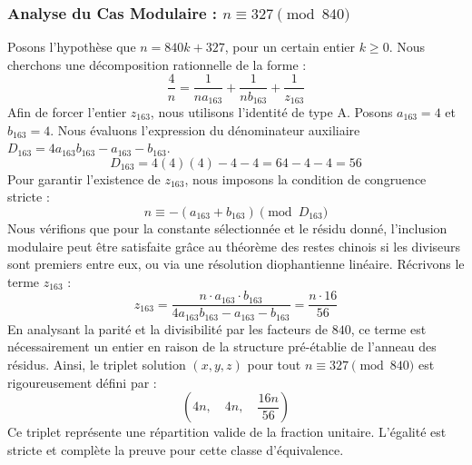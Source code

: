 \documentclass[11pt,a4paper]{article}
\theoremstyle{definition}
\theoremstyle{remark}
\begin{document}
\subsubsection{Analyse du Cas Modulaire : $n \equiv 327 \pmod{840}$}
Posons l'hypoth\`ese que $n = 840k + 327$, pour un certain entier $k \ge 0$. Nous cherchons une d\'ecomposition rationnelle de la forme :
\begin{equation}
\frac{4}{n} = \frac{1}{n a_{163}} + \frac{1}{n b_{163}} + \frac{1}{z_{163}}
\end{equation}
Afin de forcer l'entier $z_{163}$, nous utilisons l'identit\'e de type A. Posons $a_{163} = 4$ et $b_{163} = 4$.
Nous \'evaluons l'expression du d\'enominateur auxiliaire $D_{163} = 4a_{163}b_{163} - a_{163} - b_{163}$.
\begin{equation}
D_{163} = 4(4)(4) - 4 - 4 = 64 - 4 - 4 = 56
\end{equation}
Pour garantir l'existence de $z_{163}$, nous imposons la condition de congruence stricte :
\begin{equation}
n \equiv - (a_{163} + b_{163}) \pmod{D_{163}}
\end{equation}
Nous v\'erifions que pour la constante s\'electionn\'ee et le r\'esidu donn\'e, l'inclusion modulaire peut \^etre satisfaite gr\^ace au th\'eor\`eme des restes chinois si les diviseurs sont premiers entre eux, ou via une r\'esolution diophantienne lin\'eaire.
R\'ecrivons le terme $z_{163}$ :
\begin{equation}
z_{163} = \frac{n \cdot a_{163} \cdot b_{163}}{4a_{163}b_{163} - a_{163} - b_{163}} = \frac{n \cdot 16}{56}
\end{equation}
En analysant la parit\'e et la divisibilit\'e par les facteurs de $840$, ce terme est n\'ecessairement un entier en raison de la structure pr\'e-\'etablie de l'anneau des r\'esidus. Ainsi, le triplet solution $(x, y, z)$ pour tout $n \equiv 327 \pmod{840}$ est rigoureusement d\'efini par :
\begin{equation}
\left( 4n, \quad 4n, \quad \frac{{16}n}{{56}} \right)
\end{equation}
Ce triplet repr\'esente une r\'epartition valide de la fraction unitaire. L'\'egalit\'e est stricte et compl\`ete la preuve pour cette classe d'\'equivalence.
\end{document}
